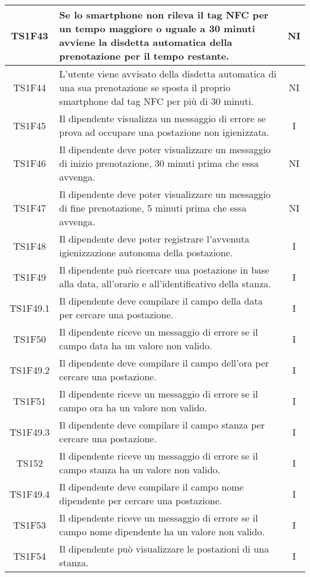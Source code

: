 \begin{center}
\begin{longtable}{|c|p{10cm}|c|}
			\hline					
			TS1F43 & Se lo smartphone non rileva il tag NFC per un tempo maggiore o uguale a 30 minuti avviene la disdetta automatica della prenotazione per il tempo restante. & NI \\	
			\hline				
			TS1F44 & L’utente viene avvisato della disdetta automatica di una sua prenotazione se sposta il proprio smartphone dal tag NFC per più di 30 minuti. & NI \\	
			\hline				
			TS1F45 & Il dipendente visualizza un messaggio di errore se prova ad occupare una postazione non igienizzata. & I \\	
			\hline
			TS1F46 & Il dipendente deve poter visualizzare un messaggio di inizio prenotazione, 30 minuti prima che essa avvenga. & NI \\	
			\hline
			TS1F47 & Il dipendente deve poter visualizzare un messaggio di fine prenotazione, 5 minuti prima che essa avvenga. & NI \\	
			\hline
			TS1F48 & Il dipendente deve poter registrare l'avvenuta igienizzazione autonoma della postazione. & I \\	
			\hline
			TS1F49 & Il dipendente può ricercare una postazione in base alla data, all'orario e all'identificativo della stanza. & I \\	
			\hline
			TS1F49.1 & Il dipendente deve compilare il campo della data per cercare una postazione. & I \\	
			\hline
			TS1F50 & Il dipendente riceve un messaggio di errore se il campo data ha un valore non valido. & I \\	
			\hline
			TS1F49.2 & Il dipendente deve compilare il campo dell'ora per cercare una postazione. & I \\	
			\hline
			TS1F51 & Il dipendente riceve un messaggio di errore se il campo ora ha un valore non valido. & I \\	
			\hline			
			TS1F49.3 & Il dipendente deve compilare il campo stanza per cercare una postazione. & I \\	
			\hline
			TS152 & Il dipendente riceve un messaggio di errore se il campo stanza ha un valore non valido. & I \\	
			\hline			
			TS1F49.4 & Il dipendente deve compilare il campo nome dipendente per cercare una postazione. & I \\	
			\hline
			TS1F53 & Il dipendente riceve un messaggio di errore se il campo nome dipendente ha un valore non valido. & I \\	
			\hline
			TS1F54 & Il dipendente può visualizzare le postazioni di una stanza. & I \\	

\end{longtable}
\end{center}
